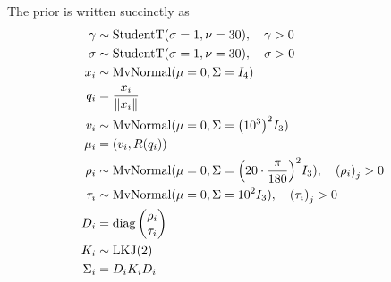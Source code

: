 \documentclass[../../main.tex]{subfiles}
\begin{document}
\begin{refsection}
	The prior is written succinctly as
	\begin{align}
		\begin{split}
			\gamma   & \sim \mathrm{StudentT}(\sigma=1, \nu=30), \quad \gamma > 0                                          \\
			\sigma   & \sim \mathrm{StudentT}(\sigma=1, \nu=30), \quad \sigma > 0                                          \\
			x_i &\sim \mathrm{MvNormal}(\mu=0, \Sigma=I_4)\\
			q_i &= \frac{x_i}{\norm{x_i}}\\
			v_i      & \sim \mathrm{MvNormal}(\mu = 0, \Sigma = \qty(10^3)^2 I_3)                                           \\
			\mu_i    & = (v_i, R(q_i))                                                                                      \\
			\rho_i   & \sim \mathrm{MvNormal}(\mu=0, \Sigma=\qty(20 \cdot \frac{\pi}{180})^2 I_3), \quad \qty(\rho_i)_j > 0 \\
			\tau_i   & \sim \mathrm{MvNormal}(\mu=0, \Sigma=10^2 I_3), \quad \qty(\tau_i)_j > 0                             \\
			D_i      & = \diag\mqty(\rho_i \\ \tau_i) \\
			K_i      & \sim \mathrm{LKJ}(2)                                                                                 \\
			\Sigma_i & = D_i K_i D_i                                                                                              \\
		\end{split}
	\end{align}

	\clearpage
	\printbibliography[heading=subbibintoc]
\end{refsection}
\end{document}
